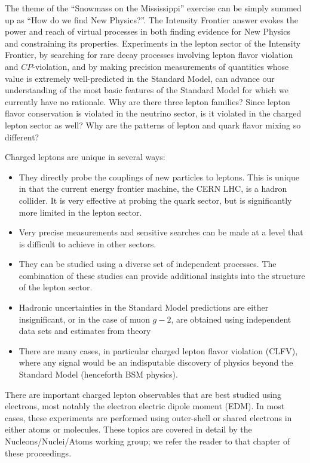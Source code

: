 The theme of the ``Snowmass on the Mississippi'' exercise can be simply summed up as ``How do we find New Physics?''. The Intensity Frontier answer evokes the power and reach of virtual processes in both finding evidence for New Physics and constraining its properties. Experiments in the lepton sector of the Intensity Frontier, by searching for rare decay processes involving lepton flavor violation and $C\!P$-violation, and by making precision measurements of quantities whose value is extremely well-predicted in the Standard Model, can advance our understanding of the most basic features of the Standard Model for which we currently have no rationale. Why are there three lepton families? Since lepton flavor conservation is violated in the neutrino sector, is it violated in the charged lepton sector as well? Why are the patterns of lepton and quark flavor mixing so different?

 Charged leptons are unique in several ways:
\begin{itemize}
\item
They directly probe the couplings of new particles to leptons.  This is unique in that the current energy frontier machine, the 
CERN LHC, is a hadron
collider. It is very effective at probing the quark sector, but
is significantly more limited in the lepton sector.
\item
Very
precise measurements  and sensitive searches can be made at a level that is difficult to achieve in
other sectors.
\item
They can be studied using a diverse set of independent
processes. The combination of these studies can provide additional
insights into the structure of the lepton sector.
\item
Hadronic uncertainties in the Standard Model predictions are either insignificant, or in the case of muon $g-2$, are obtained using independent data sets and estimates from theory
\item
There are  many cases, in particular charged lepton flavor violation (CLFV), where any signal would be an indisputable discovery of physics beyond the Standard Model (henceforth BSM physics).
\end{itemize}

There are important charged lepton observables that are best studied using electrons, most notably the electron electric dipole moment (EDM).  In most cases, these experiments are performed using outer-shell or shared electrons in either atoms or molecules.  These topics are covered in detail by the Nucleons/Nuclei/Atoms working group; we refer the reader to that chapter of these proceedings.


